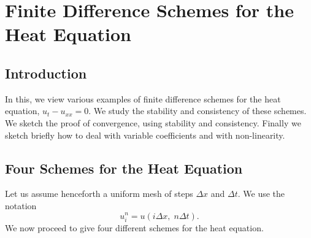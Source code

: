 
\chapter{Finite Difference Schemes for the Heat Equation}\label{chap7}

\section{Introduction}\label{chap7:sec7.1}

In this\pageoriginale, we view various examples of finite difference
schemes for the heat equation, $u_t - u_{xx} = 0$. We study the
stability and consistency of these schemes. We sketch the proof of
convergence, using stability and consistency. Finally we sketch
briefly how to deal with variable coefficients and with non-linearity.

\section{Four Schemes for the Heat Equation}\label{chap7:sec7.2}

Let us assume henceforth a uniform mesh of steps $\Delta x$ and
$\Delta t$. We use the notation
\begin{equation*}
u^n_i = u(i \Delta x, \;n \Delta t).
\tag{7.1}\label{eq7.1}
\end{equation*}
We now proceed to give four different schemes for the heat equation.

